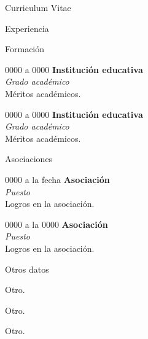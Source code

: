 \documentclass[letterpaper,12pt]{article}
\begin{document}
\begin{cv}{Curriculum Vitae}
\begin{cvlist}{Experiencia}
\end{cvlist}

\begin{cvlist}{Formación}

	\item[0000 a 0000] \textbf{Institución educativa}\\
		\emph{Grado académico}\\
		Méritos académicos.

	\item[0000 a 0000] \textbf{Institución educativa}\\
		\emph{Grado académico}\\
		Méritos académicos.

\end{cvlist}

\begin{cvlist}{Asociaciones}

	\item[0000 a la fecha] \textbf{Asociación}\\
		\emph{Puesto}\\
		Logros en la asociación.

	\item[0000 a la 0000] \textbf{Asociación}\\
		\emph{Puesto}\\
		Logros en la asociación.

\end{cvlist}

\begin{cvlist}{Otros datos}
	\item Otro.
	\item Otro.
	\item Otro.
\end{cvlist}

\end{cv}
\end{document}
